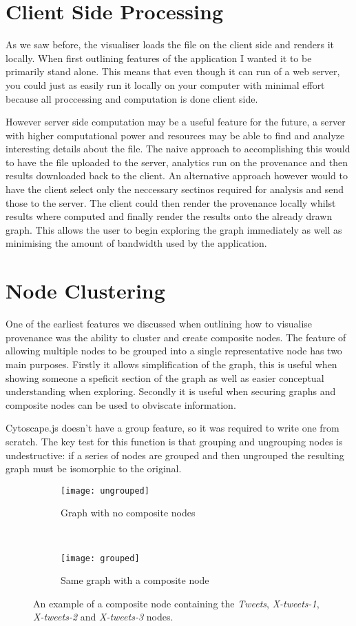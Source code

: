 \section{Client Side Processing}
\label{sec:client_side_processing}

As we saw before, the visualiser loads the file on the client side and renders it locally. When first outlining features of the application I wanted it to be primarily stand alone. This means that even though it can run of a web server, you could just as easily run it locally on your computer with minimal effort because all proccessing and computation is done client side. 

However server side computation may be a useful feature for the future, a server with higher computational power and resources may be able to find and analyze interesting details about the file. The naive approach to accomplishing this would to have the file uploaded to the server, analytics run on the provenance and then results downloaded back to the client. An alternative approach however would to have the client select only the neccessary sectinos required for analysis and send those to the server. The client could then render the provenance locally whilst results where computed and finally render the results onto the already drawn graph. This allows the user to begin exploring the graph immediately as well as minimising the amount of bandwidth used by the application.

\section{Node Clustering}
One of the earliest features we discussed when outlining how to visualise provenance was the ability to cluster and create composite nodes. The feature of allowing multiple nodes to be grouped into a single representative node has two main purposes. Firstly it allows simplification of the graph, this is useful when showing someone a speficit section of the graph as well as easier conceptual understanding when exploring. Secondly it is useful when securing graphs and composite nodes can be used to obviscate information.

Cytoscape.js doesn't have a group feature, so it was required to write one from scratch. The key test for this function is that grouping and ungrouping nodes is undestructive: if a series of nodes are grouped and then ungrouped the resulting graph must be isomorphic to the original.

\begin{figure}[h]
  \centering
  \begin{subfigure}[t]{0.5\textwidth}
    \texttt{[image: ungrouped]}
    \caption{Graph with no composite nodes}
  \end{subfigure}
  ~
  \begin{subfigure}[t]{0.5\textwidth}
    \texttt{[image: grouped]}
    \caption{Same graph with a composite node}
  \end{subfigure}
  \caption{An example of a composite node containing the \textit{Tweets}, \textit{X-tweets-1}, \textit{X-tweets-2} and \textit{X-tweets-3} nodes.}
\end{figure}


